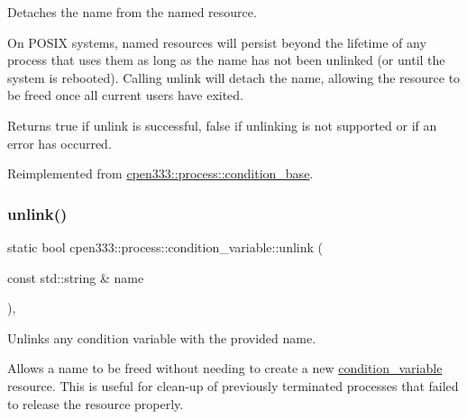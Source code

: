 Detaches the name from the named resource. 

On P\+O\+S\+IX systems, named resources will persist beyond the lifetime of any process that uses them as long as the name has not been unlinked (or until the system is rebooted). Calling {\ttfamily unlink} will detach the name, allowing the resource to be freed once all current users have exited.

\begin{DoxyReturn}{Returns}
{\ttfamily true} if unlink is successful, {\ttfamily false} if unlinking is not supported or if an error has occurred. 
\end{DoxyReturn}


Reimplemented from \hyperlink{classcpen333_1_1process_1_1condition__base_acd6d0b53a828aa161ccad06885eaa15c}{cpen333\+::process\+::condition\+\_\+base}.

\mbox{\label{classcpen333_1_1process_1_1condition__variable_aa9c5da7417ff6c6f79d8b58333e309f8}} 
\subsubsection{\texorpdfstring{unlink()}{unlink()}\hspace{0.1cm}{\footnotesize\ttfamily [2/2]}}
{\footnotesize\ttfamily static bool cpen333\+::process\+::condition\+\_\+variable\+::unlink (\begin{DoxyParamCaption}\item[{const std\+::string \&}]{name }\end{DoxyParamCaption})\hspace{0.3cm}{\ttfamily [inline]}, {\ttfamily [static]}}



Unlinks any condition variable with the provided name. 

Allows a name to be freed without needing to create a new \hyperlink{classcpen333_1_1process_1_1condition__variable}{condition\+\_\+variable} resource. This is useful for clean-\/up of previously terminated processes that failed to release the resource properly.


